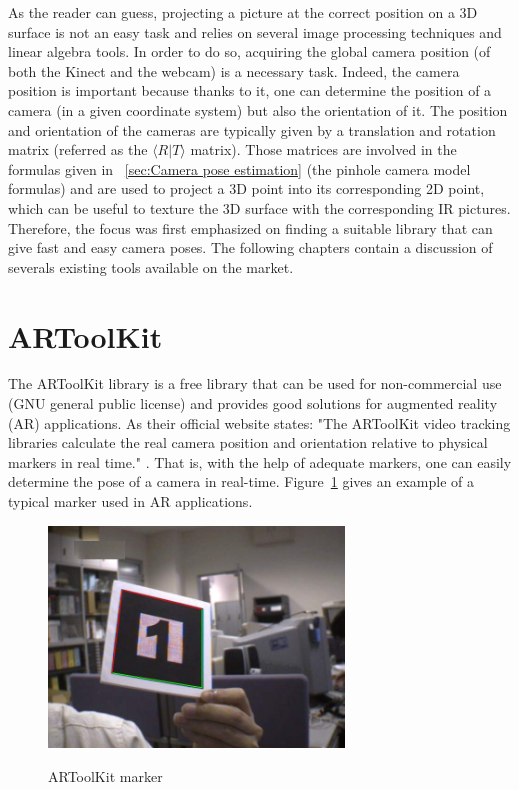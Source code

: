 As the reader can guess, projecting a picture at the correct position on a 3D surface is not an easy task and relies on several image processing techniques and linear algebra tools. In order to do so, acquiring the global camera position (of both the Kinect and the webcam) is a necessary task. Indeed, the camera position is important because thanks to it, one can determine the position of a camera (in a given coordinate system) but also the orientation of it. The position and orientation of the cameras are typically given by a translation and rotation matrix (referred as the $\langle R\vert T\rangle$ matrix). Those matrices are involved in the formulas given in ~\ref{sec:Camera pose estimation} (the pinhole camera model formulas) and are used to project a 3D point into its corresponding 2D point, which can be useful to texture the 3D surface with the corresponding IR pictures.\\

Therefore, the focus was first emphasized on finding a suitable library that can give fast and easy camera poses. The following chapters contain a discussion of severals existing tools available on the market.


\section{ARToolKit}
\label{sec:ARToolKit}
The ARToolKit library is a free library that can be used for non-commercial use (GNU general public license) and provides good solutions for augmented reality (AR) applications. As their official website states: "The ARToolKit video tracking libraries calculate the real camera position and orientation relative to physical markers in real time." \cite{artoolkit}. That is, with the help of adequate markers, one can easily determine the pose of a camera in real-time. Figure~\ref{fig:marker} \cite{artoolkit} gives an example of a typical marker used in AR applications.\\


\begin{figure}
\caption{ARToolKit marker}
\centering
    \includegraphics[width=0.7\textwidth]{images/marker.jpg}
\label{fig:marker}
\end{figure}

